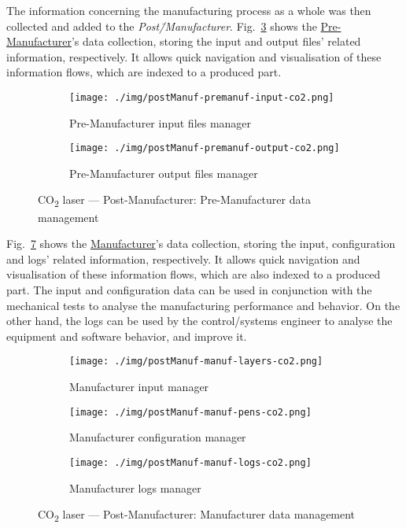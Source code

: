 The information concerning the manufacturing process as a whole was then
collected and added to the \emph{Post\=/Manufacturer}.
Fig.~\ref{fig:postManuf-premanuf-co2} shows the \underline{Pre-Manufacturer}'s data
collection, storing the input and output files' related information,
respectively. It allows quick navigation and visualisation of these information
flows, which are indexed to a produced part.

\begin{figure}[htb!]
  \centering
  \begin{subfigure}[t]{.8\textwidth}
    \texttt{[image: ./img/postManuf-premanuf-input-co2.png]}%
  \caption{Pre-Manufacturer input files manager}%
  \label{fig:postManuf-premanuf-input-co2}
  \end{subfigure}
%
  \begin{subfigure}[t]{.8\textwidth}
    \texttt{[image: ./img/postManuf-premanuf-output-co2.png]}%
  \caption{Pre-Manufacturer output files manager}%
  \label{fig:postManuf-premanuf-output-co2}
\end{subfigure}
%
  \caption{CO\textsubscript{2} laser --- Post-Manufacturer: Pre-Manufacturer
    data management}%
  \label{fig:postManuf-premanuf-co2}
\end{figure}

Fig.~\ref{fig:postManuf-manuf-co2} shows the \underline{Manufacturer}'s data
collection, storing the input, configuration and logs' related information,
respectively. It allows quick navigation and visualisation of these information
flows, which are also indexed to a produced part. The input and configuration
data can be used in conjunction with the mechanical tests to analyse the
manufacturing performance and behavior. On the other hand, the logs can be used
by the control/systems engineer to analyse the equipment and software behavior,
and improve it.

\begin{figure}[htb!]
  \centering
  \begin{subfigure}[t]{.6\textwidth}
    \texttt{[image: ./img/postManuf-manuf-layers-co2.png]}%
  \caption{Manufacturer input manager}%
  \label{fig:postManuf-manuf-layers-co2}
  \end{subfigure}
%
  \begin{subfigure}[t]{.6\textwidth}
    \texttt{[image: ./img/postManuf-manuf-pens-co2.png]}%
  \caption{Manufacturer configuration manager}%
  \label{fig:postManuf-manuf-pens-co2}
\end{subfigure}
%
  \begin{subfigure}[t]{.6\textwidth}
    \texttt{[image: ./img/postManuf-manuf-logs-co2.png]}%
  \caption{Manufacturer logs manager}%
  \label{fig:postManuf-manuf-logs-co2}
\end{subfigure}
%
  \caption{CO\textsubscript{2} laser --- Post-Manufacturer: Manufacturer
    data management}%
  \label{fig:postManuf-manuf-co2}
\end{figure}

